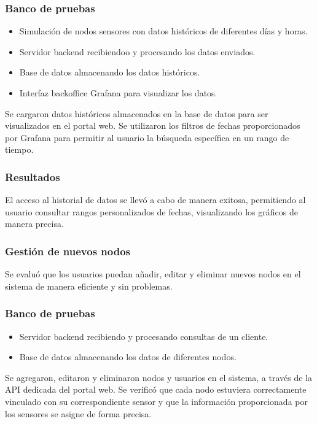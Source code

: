 \subsubsection{Banco de pruebas}
\begin{itemize}
    \item Simulación de nodos sensores con datos históricos de diferentes días y horas.
    \item Servidor backend recibiendoo y procesando los datos enviados.
    \item Base de datos almacenando los datos históricos. 
    \item Interfaz backoffice Grafana para visualizar los datos.
\end{itemize}

Se cargaron datos históricos almacenados en la base de datos para ser visualizados en el portal web. Se utilizaron los filtros de fechas proporcionados por Grafana para permitir al usuario la búsqueda específica en un rango de tiempo. 

\subsubsection{Resultados}
El acceso al historial de datos se llevó a cabo de manera exitosa, permitiendo al usuario consultar rangos personalizados de fechas, visualizando los gráficos de manera precisa. 

\subsubsection{Gestión de nuevos nodos}

Se evaluó que los usuarios puedan añadir, editar y eliminar nuevos nodos en el sistema de manera eficiente y sin problemas.

\subsubsection{Banco de pruebas}
\begin{itemize}
    \item Servidor backend recibiendo y procesando consultas de un cliente.    
    \item Base de datos almacenando los datos de diferentes nodos. 
\end{itemize}

Se agregaron, editaron y eliminaron nodos y usuarios en el sistema, a través de la API dedicada del portal web. Se verificó que cada nodo estuviera correctamente vinculado con su correspondiente sensor y que la información proporcionada por los sensores se asigne de forma precisa. 

